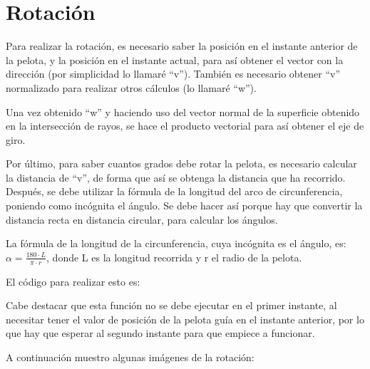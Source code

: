\section{Rotación}

Para realizar la rotación, es necesario saber la posición en el instante anterior de la pelota, y la posición en el instante actual, para así obtener el vector con la dirección (por simplicidad lo llamaré ``v''). También es necesario obtener ``v'' normalizado para realizar otros cálculos (lo llamaré ``w'').

\bigskip

Una vez obtenido ``w'' y haciendo uso del vector normal de la superficie obtenido en la intersección de rayos, se hace el producto vectorial para así obtener el eje de giro.

\bigskip

Por último, para saber cuantos grados debe rotar la pelota, es necesario calcular la distancia de ``v'', de forma que así se obtenga la distancia que ha recorrido. Después, se debe utilizar la fórmula de la longitud del arco de circunferencia, poniendo como incógnita el ángulo. Se debe hacer así porque hay que convertir la distancia recta en distancia circular, para calcular los ángulos. 

\bigskip

La fórmula de la longitud de la circunferencia, cuya incógnita es el ángulo, es: $\alpha = \frac{180 \cdot L}{\pi \cdot r} $, donde L es la longitud recorrida y r el radio de la pelota.

\bigskip

El código para realizar esto es:



Cabe destacar que esta función no se debe ejecutar en el primer instante, al necesitar tener el valor de posición de la pelota guía en el instante anterior, por lo que hay que esperar al segundo instante para que empiece a funcionar.

\bigskip

A continuación muestro algunas imágenes de la rotación:

